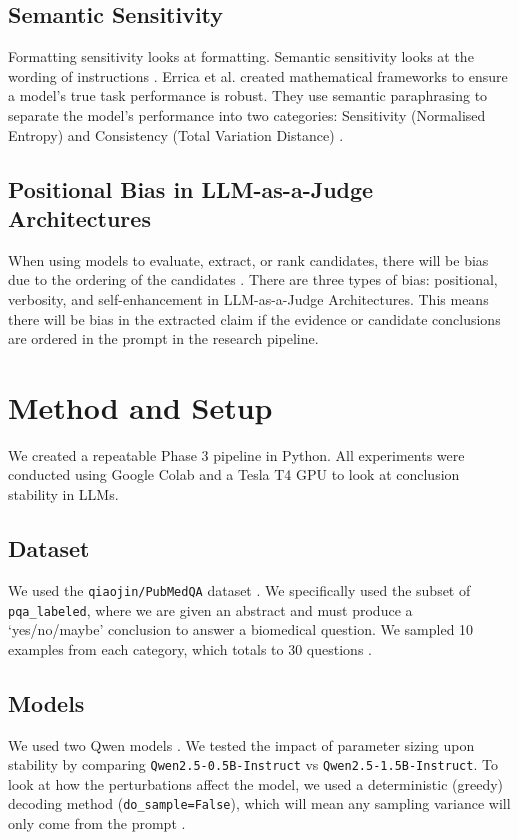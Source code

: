 \documentclass[10pt, conference, letterpaper]{IEEEtran}
\begin{document}
\subsection{Semantic Sensitivity}
Formatting sensitivity looks at formatting. Semantic sensitivity looks at the wording of instructions \cite{webson2022do}. Errica et al. \cite{errica2025wrong} created mathematical frameworks to ensure a model's true task performance is robust. They use semantic paraphrasing to separate the model's performance into two categories: Sensitivity (Normalised Entropy) and Consistency (Total Variation Distance) \cite{elazar2021measuring}.

\subsection{Positional Bias in LLM-as-a-Judge Architectures}
When using models to evaluate, extract, or rank candidates, there will be bias due to the ordering of the candidates \cite{lu2022fantastically}. There are three types of bias: positional, verbosity, and self-enhancement \cite{zheng2023judging} in LLM-as-a-Judge Architectures. This means there will be bias in the extracted claim if the evidence or candidate conclusions are ordered in the prompt in the research pipeline.

\section{Method and Setup}
We created a repeatable Phase 3 pipeline in Python. All experiments were conducted using Google Colab and a Tesla T4 GPU to look at conclusion stability in LLMs.

\subsection{Dataset}
We used the \texttt{qiaojin/PubMedQA} dataset \cite{jin2019pubmedqa}. We specifically used the subset of \texttt{pqa\_labeled}, where we are given an abstract and must produce a `yes/no/maybe' conclusion to answer a biomedical question. We sampled 10 examples from each category, which totals to 30 questions \cite{honovich2022true}.

\subsection{Models}
We used two Qwen models \cite{qwen2024}. We tested the impact of parameter sizing upon stability by comparing \texttt{Qwen2.5-0.5B-Instruct} vs \texttt{Qwen2.5-1.5B-Instruct}. To look at how the perturbations affect the model, we used a deterministic (greedy) decoding method (\texttt{do\_sample=False}), which will mean any sampling variance will only come from the prompt \cite{kojima2022large}.
\end{document}
